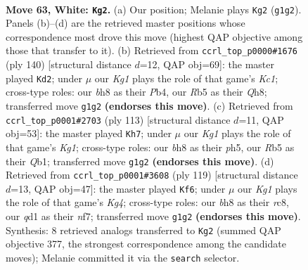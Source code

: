 \documentclass[11pt]{article}
\begin{document}
\clearpage

\begin{figure}[p]\centering
\begin{subfigure}{0.46\textwidth}\centering
\resizebox{\linewidth}{!}{%
\newchessgame
\chessboard[
  setfen={5k1b/5p2/8/1R1P4/8/8/8/3q2K1 w - - 3 63},
  showmover=false,
  pgfstyle=straightmove, color=movearrow, markmove={g1-g2}
]}
\caption{}
\end{subfigure}\hfill
\begin{subfigure}{0.46\textwidth}\centering
\resizebox{\linewidth}{!}{%
\newchessgame
\chessboard[
  setfen={7Q/1k6/2p4P/8/1P6/8/8/2K2q2 w - - 3 71},
  showmover=false,
  pgfstyle=straightmove, color=movearrow, markmove={c1-d2}
]}
\caption{}
\end{subfigure}
\\[4pt]
\begin{subfigure}{0.46\textwidth}\centering
\resizebox{\linewidth}{!}{%
\newchessgame
\chessboard[
  setfen={6k1/8/8/7P/1pQ5/6P1/5K2/1q6 b - - 2 57},
  showmover=false,
  pgfstyle=straightmove, color=movearrow, markmove={g8-h7}
]}
\caption{}
\end{subfigure}\hfill
\begin{subfigure}{0.46\textwidth}\centering
\resizebox{\linewidth}{!}{%
\newchessgame
\chessboard[
  setfen={2R5/5N2/p7/6k1/4P3/4K3/r7/8 b - - 0 60},
  showmover=false,
  pgfstyle=straightmove, color=movearrow, markmove={g5-f6}
]}
\caption{}
\end{subfigure}
\caption{\textbf{Move 63, White: \texttt{Kg2}.} (a) Our position; Melanie plays \texttt{Kg2} (\texttt{g1g2}). Panels (b)--(d) are the retrieved master positions whose correspondence most drove this move (highest QAP objective among those that transfer to it). (b) Retrieved from \texttt{ccrl\_top\_p0000\#1676} (ply 140) [structural distance $d$=12, QAP obj=69]: the master played \texttt{Kd2}; under $\mu$ our \emph{Kg1} plays the role of that game's \emph{Kc1}; cross-type roles: our \emph{b}h8 as their \emph{P}b4, our \emph{R}b5 as their \emph{Q}h8; transferred move \texttt{g1g2} \textbf{(endorses this move)}. (c) Retrieved from \texttt{ccrl\_top\_p0001\#2703} (ply 113) [structural distance $d$=11, QAP obj=53]: the master played \texttt{Kh7}; under $\mu$ our \emph{Kg1} plays the role of that game's \emph{Kg1}; cross-type roles: our \emph{b}h8 as their \emph{p}h5, our \emph{R}b5 as their \emph{Q}b1; transferred move \texttt{g1g2} \textbf{(endorses this move)}. (d) Retrieved from \texttt{ccrl\_top\_p0001\#3608} (ply 119) [structural distance $d$=13, QAP obj=47]: the master played \texttt{Kf6}; under $\mu$ our \emph{Kg1} plays the role of that game's \emph{Kg4}; cross-type roles: our \emph{b}h8 as their \emph{r}c8, our \emph{q}d1 as their \emph{n}f7; transferred move \texttt{g1g2} \textbf{(endorses this move)}. Synthesis: 8 retrieved analogs transferred to \texttt{Kg2} (summed QAP objective 377, the strongest correspondence among the candidate moves); Melanie committed it via the \texttt{search} selector.}
\label{fig:thought-m124}
\end{figure}
\end{document}
